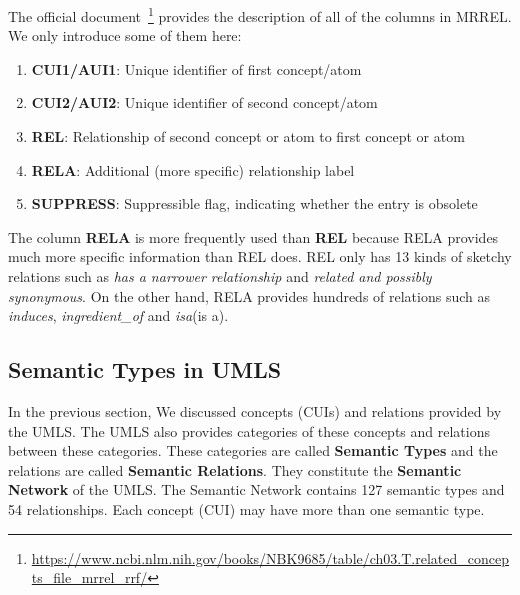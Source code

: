 The official document~\footnote{\url{https://www.ncbi.nlm.nih.gov/books/NBK9685/table/ch03.T.related_concepts_file_mrrel_rrf/}} provides the description of all of the columns in MRREL. We only introduce some of them here: \par
\begin{enumerate}
  \item \textbf{CUI1/AUI1}: Unique identifier of first concept/atom
  \item \textbf{CUI2/AUI2}: Unique identifier of second concept/atom
  \item \textbf{REL}: Relationship of second concept or atom to first concept or atom
  \item \textbf{RELA}: Additional (more specific) relationship label
  \item \textbf{SUPPRESS}: Suppressible flag, indicating whether the entry is obsolete
\end{enumerate}

The column \textbf{RELA} is more frequently used than \textbf{REL} because RELA provides much more specific information than REL does. REL only has 13 kinds of sketchy relations such as \emph{has a narrower relationship} and \emph{related and possibly synonymous}. On the other hand, RELA provides hundreds of relations such as \emph{induces},  \emph{ingredient\_of} and \emph{isa}(is a).


\subsection{Semantic Types in UMLS}
In the previous section, We discussed concepts (CUIs) and relations provided by the UMLS. 
The UMLS also provides categories of these concepts and relations between these categories. 
These categories are called \textbf{Semantic Types} and the relations are called \textbf{Semantic Relations}.
They constitute the \textbf{Semantic Network} of the UMLS.
The Semantic Network contains 127 semantic types and 54 relationships.
Each concept (CUI) may have more than one semantic type.

